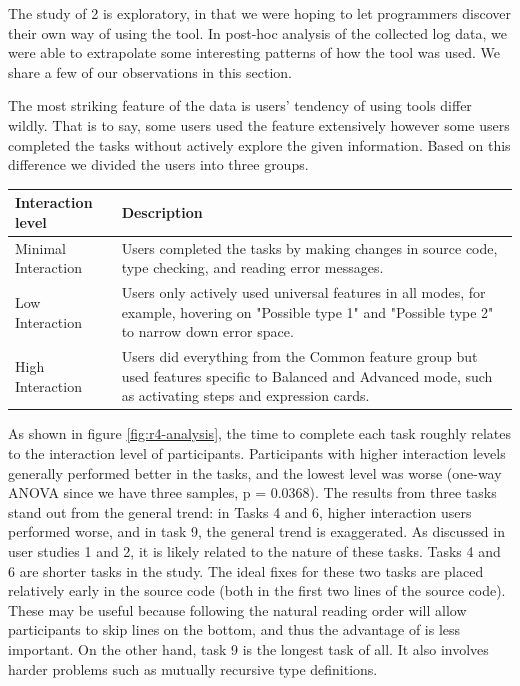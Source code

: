 The study of \chameleon{} 2 is exploratory, in that we were hoping to let programmers discover their own way of using the tool. In post-hoc analysis of the collected log data, we were able to extrapolate some interesting patterns of how the tool was used. We share a few of our observations in this section.


The most striking feature of the data is users' tendency of using tools differ wildly. That is to say, some users used the feature extensively however some users completed the tasks without actively explore the given information. Based on this difference we divided the users into three groups.

\begin{tabularx}{\linewidth}{ 
  | >{\raggedright\arraybackslash}X 
  | >{\raggedright\arraybackslash}X  | }

    \hline
        Interaction level & Description \\ \hline
        Minimal Interaction & Users completed the tasks by making changes in source code, type checking, and reading error messages. \\ \hline
        Low Interaction & Users only actively used universal features in all modes, for example, hovering on "Possible type 1" and "Possible type 2" to narrow down error space. \\ \hline
        High Interaction & Users did everything from the Common feature group but used features specific to Balanced and Advanced mode, such as activating steps and expression cards. \\ \hline

\end{tabularx}



As shown in  figure \ref{fig:r4-analysis}, the time to complete each task roughly relates to the interaction level of participants. Participants with higher interaction levels generally performed better in the tasks, and the lowest level was worse (one-way ANOVA since we have three samples, p = 0.0368). The results from three tasks stand out from the general trend: in Tasks 4 and 6, higher interaction users performed worse, and in task 9, the general trend is exaggerated. As discussed in user studies 1 and 2, it is likely related to the nature of these tasks. Tasks 4 and 6 are shorter tasks in the study. The ideal fixes for these two tasks are placed relatively early in the source code (both in the first two lines of the source code). These may be useful because following the natural reading order will allow participants to skip lines on the bottom, and thus the advantage of \chameleon{} is less important. On the other hand, task 9 is the longest task of all. It also involves harder problems such as mutually recursive type definitions.

